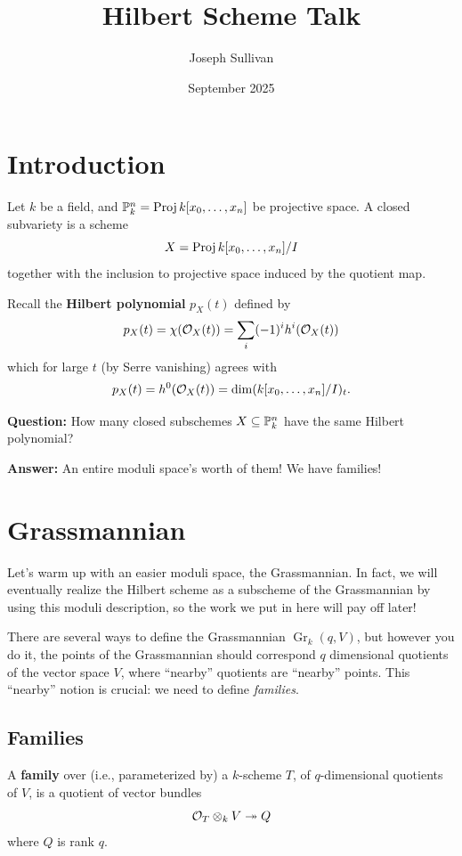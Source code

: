 \documentclass[12pt]{article}
\title{Hilbert Scheme Talk}
\author{Joseph Sullivan}
\date{September 2025}
\DeclareMathOperator{\Gr}{Gr}
\begin{document}
\maketitle
\tableofcontents

\section*{Introduction}

Let $k$ be a field, and $\P_k^n = \Proj k[x_0,\dots,x_n]$ be projective space. A closed subvariety is a scheme
\[X = \Proj k[x_0,\dots,x_n]/I\]
together with the inclusion to projective space induced by the quotient map.

Recall the \textbf{Hilbert polynomial} $p_X(t)$ defined by
\[p_X(t) = \chi(\cO_X(t)) = \sum_{i} (-1)^i h^i(\cO_X(t))\]
which for large $t$ (by Serre vanishing) agrees with
\[p_X(t) = h^0(\cO_X(t)) = \dim (k[x_0,\dots,x_n]/I)_t.\]

\textbf{Question:} How many closed subschemes $X\subseteq \P_k^n$ have the same Hilbert polynomial?

\textbf{Answer:} An entire moduli space's worth of them! We have families!

\section{Grassmannian}

Let's warm up with an easier moduli space, the Grassmannian. In fact, we will eventually realize the Hilbert scheme as a subscheme of the Grassmannian by using this moduli description, so the work we put in here will pay off later!

There are several ways to define the Grassmannian $\Gr_k(q,V)$, but however you do it, the points of the Grassmannian should correspond $q$ dimensional quotients of the vector space $V$, where ``nearby'' quotients are ``nearby'' points. This ``nearby'' notion is crucial: we need to define \textit{families}.

\subsection{Families}

\begin{defn}
    A \textbf{family} over (i.e., parameterized by) a $k$-scheme $T$, of $q$-dimensional quotients of $V$, is a quotient of vector bundles
    \[\cO_T\otimes_k V \twoheadrightarrow Q\]
    where $Q$ is rank $q$.
\end{defn}
\end{document}
